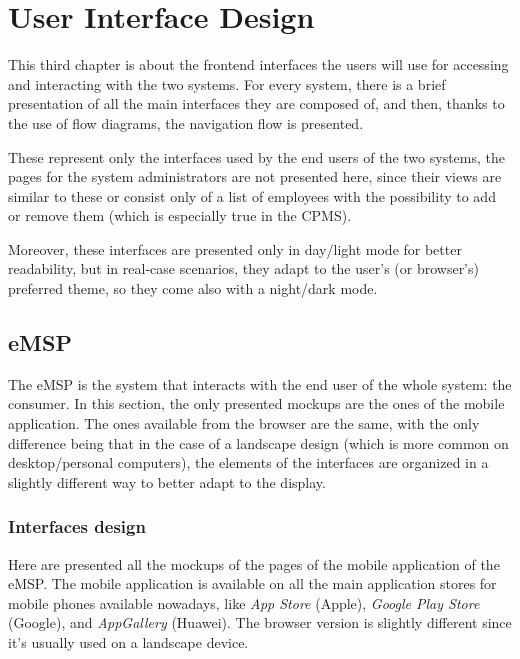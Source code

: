 \chapter{User Interface Design} \label{ui}

This third chapter is about the frontend interfaces the users will use for accessing and interacting with the two systems. For every system, there is a brief  presentation of all the main interfaces they are composed of, and then, thanks to the use of flow diagrams, the navigation flow is presented.\medskip

These represent only the interfaces used by the end users of the two systems, the pages for the system administrators are not presented here, since their views are similar to these or consist only of a list of employees with the possibility to add or remove them (which is especially true in the CPMS).\medskip

Moreover, these interfaces are presented only in day/light mode for better readability, but in real-case scenarios, they adapt to the user's (or browser's) preferred theme, so they come also with a night/dark mode.

\section{eMSP}

The eMSP is the system that interacts with the end user of the whole system: the consumer. In this section, the only presented mockups are the ones of the mobile application. The ones available from the browser are the same, with the only difference being that in the case of a landscape design (which is more common on desktop/personal computers), the elements of the interfaces are organized in a slightly different way to better adapt to the display.

\subsection{Interfaces design}

Here are presented all the mockups of the pages of the mobile application of the eMSP. The mobile application is available on all the main application stores for mobile phones available nowadays, like \textit{App Store} (Apple), \textit{Google Play Store} (Google), and \textit{AppGallery} (Huawei). The browser version is slightly different since it's usually used on a landscape device.

\pagebreak

